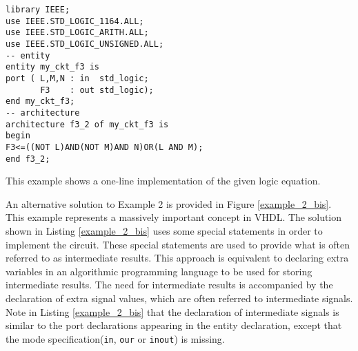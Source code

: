 \begin{minipage}{0.55\linewidth}
\begin{lstlisting}[label=example_2, caption=Solution of Example 2.]
library IEEE;
use IEEE.STD_LOGIC_1164.ALL;
use IEEE.STD_LOGIC_ARITH.ALL;
use IEEE.STD_LOGIC_UNSIGNED.ALL;
-- entity
entity my_ckt_f3 is
port ( L,M,N : in  std_logic;
       F3    : out std_logic);
end my_ckt_f3;
-- architecture
architecture f3_2 of my_ckt_f3 is
begin
F3<=((NOT L)AND(NOT M)AND N)OR(L AND M);
end f3_2;
\end{lstlisting}
\end{minipage}
\begin{minipage}{0.4\linewidth}
\begin{flushright}
\end{flushright}
\end{minipage}

This example shows a one-line implementation of the given logic equation.

An alternative solution to Example 2 is provided in Figure \ref{example_2_bis}. This example represents a massively important concept in VHDL. The solution shown in Listing \ref{example_2_bis} uses some special statements in order to implement the circuit. These special statements are used to provide what is often referred to as intermediate results. This approach is equivalent to declaring extra variables in an algorithmic programming language to be used for storing intermediate results. The need for intermediate results is accompanied by the declaration of extra signal values, which are often referred to intermediate signals. Note in Listing \ref{example_2_bis} that the declaration of intermediate signals is similar to the port declarations appearing in the entity declaration, except that the mode specification(\texttt{in}, \texttt{our} or \texttt{inout}) is missing. 

